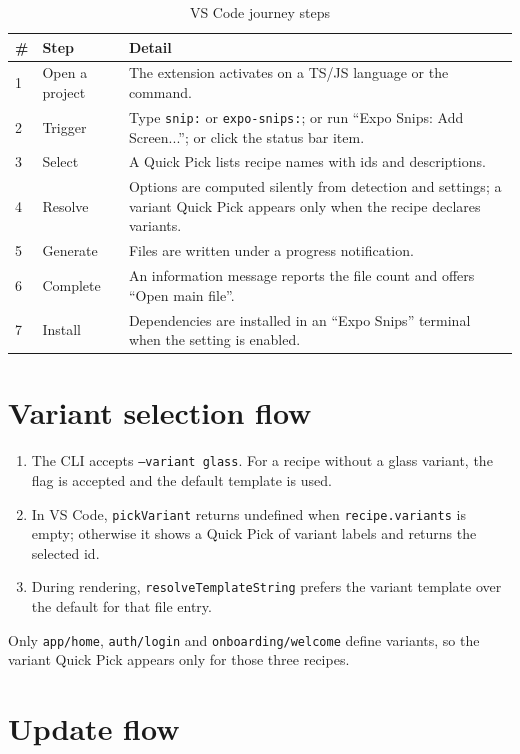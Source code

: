 \begin{longtable}{p{1cm}p{4.2cm}p{9.2cm}}
\caption{VS Code journey steps}\\
\toprule
\textbf{\#} & \textbf{Step} & \textbf{Detail} \\
\midrule

1 & Open a project & The extension activates on a TS/JS language or the command. \\
2 & Trigger & Type \texttt{snip:} or \texttt{expo-snips:}; or run ``Expo Snips: Add
Screen...''; or click the status bar item. \\
3 & Select & A Quick Pick lists recipe names with ids and descriptions. \\
4 & Resolve & Options are computed silently from detection and settings; a variant
Quick Pick appears only when the recipe declares variants. \\
5 & Generate & Files are written under a progress notification. \\
6 & Complete & An information message reports the file count and offers ``Open main
file''. \\
7 & Install & Dependencies are installed in an ``Expo Snips'' terminal when the
setting is enabled. \\
\bottomrule
\end{longtable}

\section{Variant selection flow}

\begin{enumerate}
  \item The CLI accepts \texttt{--variant glass}. For a recipe without a glass
        variant, the flag is accepted and the default template is used.
  \item In VS Code, \texttt{pickVariant} returns undefined when
        \texttt{recipe.variants} is empty; otherwise it shows a Quick Pick of
        variant labels and returns the selected id.
  \item During rendering, \texttt{resolveTemplateString} prefers the variant
        template over the default for that file entry.
\end{enumerate}

Only \texttt{app/home}, \texttt{auth/login} and \texttt{onboarding/welcome} define
variants, so the variant Quick Pick appears only for those three recipes.

\section{Update flow}

